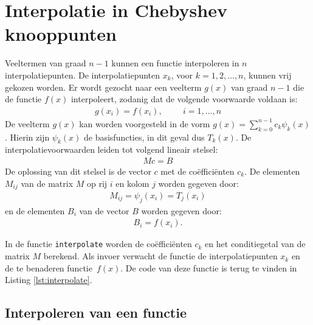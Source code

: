 \documentclass[a4paper, 12pt, titlepage, fleqn]{article}
\begin{document}
\section{Interpolatie in Chebyshev knooppunten}
\label{sec:interpolatie}
Veeltermen van graad $n-1$ kunnen een functie interpoleren in $n$ interpolatiepunten. De interpolatiepunten $x_k$, voor $k = 1,2,\ldots,n$, kunnen vrij gekozen worden. Er wordt gezocht naar een veelterm $g(x)$ van graad $n-1$ die de functie $f(x)$ interpoleert, zodanig dat de volgende voorwaarde voldaan is:
\begin{align*}
g(x_i) = f(x_i), \hspace{1cm} i = 1,\ldots,n
\end{align*}
De veelterm $g(x)$ kan worden voorgesteld in de vorm $g(x) = \sum_{k=0}^{n-1}c_k\psi_k(x)$. Hierin zijn $\psi_k(x)$ de basisfuncties, in dit geval dus $T_k(x)$. De interpolatievoorwaarden leiden tot volgend lineair stelsel:
\begin{align}
Mc = B
\label{eq:matrixM}
\end{align}
De oplossing van dit stelsel is de vector $c$ met de co\"effici\"enten $c_k$. De elementen $M_{ij}$ van de matrix $M$ op rij $i$ en kolom $j$ worden gegeven door:
\begin{align*}
M_{ij} = \psi_j(x_i) = T_j(x_i)
\end{align*}
en de elementen $B_i$ van de vector $B$ worden gegeven door:
\begin{align*}
B_i = f(x_i).
\end{align*}

In de functie \texttt{interpolate} worden de co\"effici\"enten $c_k$ en het conditiegetal van de matrix $M$ berekend. Als invoer verwacht de functie de interpolatiepunten $x_k$ en de te benaderen functie~$f(x)$. De code van deze functie is terug te vinden in Listing \ref{lst:interpolate}.



\subsection{Interpoleren van een functie}
\end{document}
